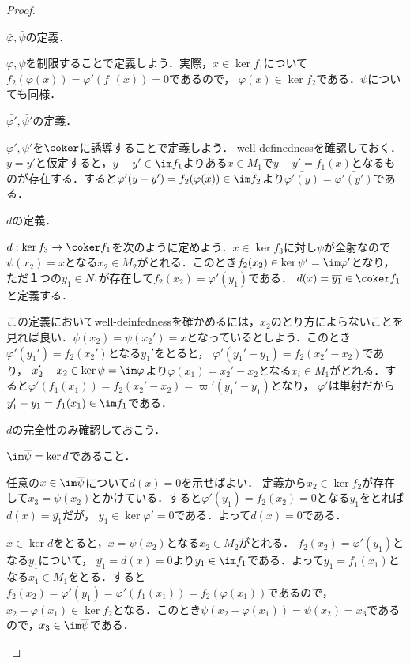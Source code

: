 \begin{proof}
	\begin{step}
		\item $\bar{\varphi},\bar{\psi}$の定義．
		
			$\varphi,\psi$を制限することで定義しよう．実際，$x\in\ker f_1$について$f_2(\varphi(x))=\varphi'(f_1(x))=0$であるので， $\varphi(x)\in\ker f_2$である．$\psi$についても同様．
			
		\item $\bar{\varphi'},\bar{\psi'}$の定義．
		
			$\varphi',\psi'$を$\coker $に誘導することで定義しよう． well-definednessを確認しておく． $\bar{y}=\bar{y'}$と仮定すると，$y-y'\in\im f_1$よりある$x\in M_1$で$y-y'=f_1(x)$となるものが存在する．すると$\varphi'(y-y')=f_2(\varphi(x))\in\im f_2$より$\bar{\varphi'(y)}=\bar{\varphi'(y')}$である．
			
		\item $d$の定義．
		
			$d:\ker f_3\to\coker f_1$を次のように定めよう．$x\in\ker f_3$に対し$\psi$が全射なので$\psi(x_2)=x$となる$x_2\in M_2$がとれる．このとき$f_2(x_2)\in\ker\psi'=\im\varphi'$となり，ただ１つの$y_1\in N_1$が存在して$f_2(x_2)=\varphi'(y_1)$である． $d(x)=\bar{y_1}\in\coker f_1$と定義する．
			
			この定義においてwell-deinfednessを確かめるには，$x_2$のとり方によらないことを見れば良い．$\psi(x_2)=\psi(x_2')=x$となっているとしよう．このとき$\varphi'(y_1')=f_2(x_2')$となる$y_1'$をとると， $\varphi'(y_1'-y_1)=f_2(x_2'-x_2)$であり， $x_2'-x_2\in\ker\psi=\im\varphi$より$\varphi(x_1)=x_2'-x_2$となる$x_i\in M_1$がとれる．すると$\varphi'(f_1(x_1))=f_2(x_2'-x_2)=\varpi'(y_1'-y_1)$となり， $\varphi'$は単射だから$y_1'-y_1=f_1(x_1)\in\im f_1$である．
			
		\item $d$の完全性のみ確認しておこう．
		
		\begin{sakura}
			\item $\im\bar\psi=\ker d$であること．
			
			任意の$x\in\im\bar\psi$について$d(x)=0$を示せばよい． 定義から$x_2\in\ker f_2$が存在して$x_3=\psi(x_2)$とかけている．すると$\varphi'(y_1)=f_2(x_2)=0$となる$y_1$をとれば$d(x)=\bar{y_1}$だが， $y_1\in\ker\varphi'=0$である．よって$d(x)=0$である．
			
			$x\in\ker d$をとると，$x=\psi(x_2)$となる$x_2\in M_2$がとれる． $f_2(x_2)=\varphi'(y_1)$となる$y_1$について， $\bar{y_1}=d(x)=0$より$y_1\in\im f_1$である．よって$y_1=f_1(x_1)$となる$x_1\in M_1$をとる．すると$f_2(x_2)=\varphi'(y_1)=\varphi'(f_1(x_1))=f_2(\varphi(x_1))$であるので，$x_2-\varphi(x_1)\in\ker f_2$となる．このとき$\psi(x_2-\varphi(x_1))=\psi(x_2)=x_3$であるので，$x_3\in\im\bar\psi$である．
		

\end{sakura}
\end{step}
\end{proof}
